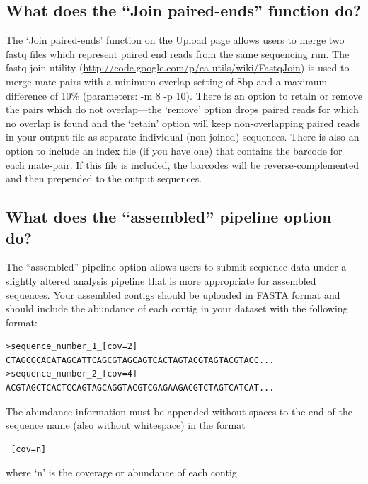 \documentclass[12pt,fullpage]{report}
\begin{document}
\subsection*{What does the ``Join paired-ends'' function do?}
The `Join paired-ends' function on the Upload page allows users to merge two fastq files which represent paired end reads from the same sequencing run. The fastq-join utility (\url{http://code.google.com/p/ea-utils/wiki/FastqJoin}) is used to merge mate-pairs with a minimum overlap setting of 8bp and a maximum difference of 10\% (parameters: -m 8 -p 10).  There is an option to retain or remove the pairs which do not overlap---the `remove' option drops paired reads for which no overlap is found and the `retain' option will keep non-overlapping paired reads in your output file as separate individual (non-joined) sequences.  There is also an option to include an index file (if you have one) that contains the barcode for each mate-pair.  If this file is included, the barcodes will be reverse-complemented and then prepended to the output sequences.
\subsection*{What does the ``assembled'' pipeline option do?}
The ``assembled'' pipeline option allows users to submit sequence data under a slightly altered analysis pipeline that is more appropriate for assembled sequences. Your assembled contigs should be uploaded in FASTA format and should include the abundance of each contig in your dataset with the following format:

\begin{small}
\begin{verbatim}
>sequence_number_1_[cov=2]
CTAGCGCACATAGCATTCAGCGTAGCAGTCACTAGTACGTAGTACGTACC...
>sequence_number_2_[cov=4]
ACGTAGCTCACTCCAGTAGCAGGTACGTCGAGAAGACGTCTAGTCATCAT...
\end{verbatim}
\end{small}

\noindent
The abundance information must be appended without spaces to the end of the sequence name (also without whitespace) in the format
\begin{small}
\begin{verbatim}
_[cov=n]
\end{verbatim}
\end{small}
where `n' is the coverage or abundance of each contig.
\end{document}
